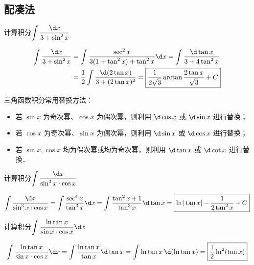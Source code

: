\documentclass[12pt, a4paper, oneside, UTF8]{ctexbook}
\begin{document}
\subsection{配凑法}
\begin{example}
    计算积分$\displaystyle \int \dfrac{\d x}{3 +\sin^2 x}$
\end{example}
\begin{solution}
    \begin{align*}
        \int \dfrac{\d x}{3 +\sin^2 x} &= \int \dfrac{\sec^2 x}{3(1+\tan^2 x) + \tan^2 x}\d x = \int \dfrac{\d \tan x}{3 + 4\tan^2 x} \\
        &=\dfrac{1}{2} \int \dfrac{\d (2\tan x)}{3 + (2\tan x)^2} = \boxed{\dfrac{1}{2\sqrt{3}} \arctan \dfrac{2\tan x}{\sqrt{3}} + C}
    \end{align*}
\end{solution}
\begin{myRemark}
    三角函数积分常用替换方法：
    \begin{itemize}
        \item 若 $\sin x$ 为奇次幂、$\cos x$ 为偶次幂，则利用 $\d \cos x$ 或 $\d \sin x$ 进行替换；
        \item 若 $\cos x$ 为奇次幂、$\sin x$ 为偶次幂，则利用 $\d \sin x$ 或 $\d \cos x$ 进行替换；
        \item 若 $\sin x, \cos x$ 均为偶次幂或均为奇次幂，则利用 $\d \tan x$ 或 $\d \cot x$ 进行替换．
    \end{itemize}
\end{myRemark}
\begin{example}
    计算积分$\displaystyle \int \dfrac{\d x}{\sin^3 x \cdot \cos x}$
\end{example}
\begin{solution}
    \begin{align*}
        \int \dfrac{\d x}{\sin^3 x \cdot \cos x} = \int \dfrac{\sec^4 x}{\tan^3 x} \d x 
        = \int \dfrac{\tan^2 x + 1}{\tan^3 x} \d \tan x
        = \boxed{\ln |\tan x|-\dfrac{1}{2\tan^2 x} + C}
    \end{align*}
\end{solution}
\begin{example}
    计算积分$\displaystyle \int \dfrac{\ln \tan x}{\sin x \cdot \cos x} \d x$
\end{example}
\begin{solution}
    \begin{align*}
        \int \dfrac{\ln \tan x}{\sin x \cdot \cos x} \d x
        =\int \dfrac{\ln \tan x}{\tan x}\d \tan x
        =\int \ln \tan x \,\d (\ln \tan x)
        =\boxed{\dfrac{1}{2}\ln^2(\tan x)}
    \end{align*}
\end{solution}
\end{document}
